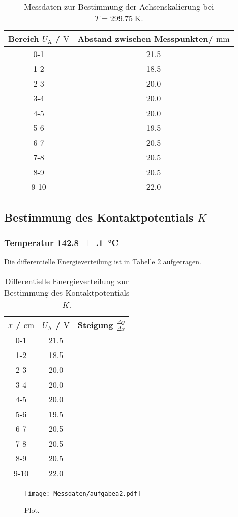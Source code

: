 \begin{table}
	\centering
	\caption{Messdaten zur Bestimmung der Achsenskalierung bei $T=\SI{299.75}{\kelvin}$.}
	\label{tab:skalaa}
	\begin{tabular}{cc}
		\toprule
		Bereich $U_{\mathrm{A}}$ / $\si{\volt}$ & Abstand zwischen Messpunkten/ $\si{\milli\meter}$ \\
		\midrule
		0-1 & 21.5 \\
		1-2 & 18.5 \\
		2-3 & 20.0 \\
		3-4 & 20.0 \\
		4-5 & 20.0 \\
		5-6 & 19.5 \\
		6-7 & 20.5 \\
		7-8 & 20.5 \\
		8-9 & 20.5 \\
		9-10 & 22.0 \\
		\bottomrule
	\end{tabular}
\end{table}
\FloatBarrier
\subsection{Bestimmung des Kontaktpotentials $K$}
\subsubsection{Temperatur \SI{142.8(1)}{\celsius}}
Die differentielle Energieverteilung ist in Tabelle \ref{tab:steigisdreieckslol} aufgetragen.
\begin{table}
	\centering
	\caption{Differentielle Energieverteilung zur Bestimmung des Kontaktpotentials $K$.}
	\label{tab:steigisdreieckslol}
	\begin{tabular}{ccc}
		\toprule
		$x$ / $\si{\centi\meter}$ & $U_{\mathrm{A}}$ / $\si{\volt}$ & Steigung $\frac{\Delta y}{\Delta x}$ \\
		\midrule
		0-1 & 21.5 \\
		1-2 & 18.5 \\
		2-3 & 20.0 \\
		3-4 & 20.0 \\
		4-5 & 20.0 \\
		5-6 & 19.5 \\
		6-7 & 20.5 \\
		7-8 & 20.5 \\
		8-9 & 20.5 \\
		9-10 & 22.0 \\
		\bottomrule
	\end{tabular}
\end{table}
\begin{figure}
	\centering
	\texttt{[image: Messdaten/aufgabea2.pdf]}
	\caption{Plot.}
	\label{fig:aufgabeA2}
\end{figure}





